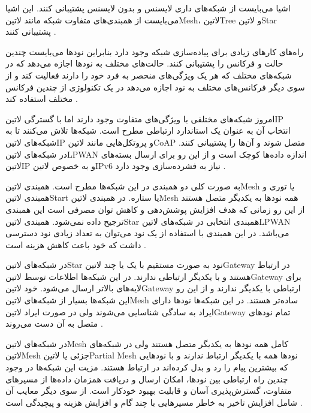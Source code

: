 
اشیا می‌بایست از شبکه‌های داری لایسنس و بدون لایسنس پشتیبانی کنند.
این اشیا می‌بایست از همبندی‌های متفاوت شبکه مانند ‌لاتین{Mesh}، ‌لاتین{Tree} و ‌لاتین{Star} پشتیبانی کنند
.

راه‌های کارهای زیادی برای پیاده‌سازی شبکه وجود دارد بنابراین نودها می‌بایست چندین حالت و فرکانس را پشتیبانی کنند.
حالت‌های مختلف به نودها اجازه می‌دهد که در شبکه‌های مختلف که هر یک ویژگی‌های منحصر به فرد خود را دارند
فعالیت کند و از سوی دیگر فرکانس‌های مختلف به نود اجازه می‌دهد در یک تکنولوژی از چندین فرکانس مختلف استفاده کند
.


امروز شبکه‌های مختلفی با ویژگی‌های متفاوت وجود دارند اما با گسترگی ‌لاتین{IP} انتخاب آن به عنوان
یک استاندارد ارتباطی مطرح است. شبکه‌ها تلاش می‌کنند تا به شبکه‌های ‌لاتین{IP} و پروتکل‌هایی مانند
‌لاتین{CoAP} متصل شوند و آن‌ها را پشتیبانی کنند.
در شبکه‌های ‌لاتین{LPWAN} اندازه داده‌ها کوچک است و از این رو برای ارسال بسته‌های ‌لاتین{IP} و
به خصوص ‌لاتین{IPv6} نیاز به فشرده‌سازی وجود دارد
.


به صورت کلی دو همبندی در این شبکه‌ها مطرح است. همبندی ‌لاتین{Mesh} یا توری
و همبندی ‌لاتین{Start} یا ستاره.
در همبندی ‌لاتین{Mesh} همه نودها به یکدیگر متصل هستند از این رو زمانی که هدف
افزایش پوشش‌دهی و کاهش توان مصرفی است این همبندی ترجیح داده نمی‌شود. همبندی
‌لاتین{Star} همبندی انتخابی در شبکه‌های ‌لاتین{LPWAN} می‌باشد.
در این همبندی با استفاده از یک نود می‌توان به تعداد زیادی نود دسترسی داشت که
خود باعث کاهش هزینه است
.

در شبکه‌های ‌لاتین{Star} نود به صورت مستقیم با یک یا چند ‌لاتین{Gateway} در ارتباط هستند
و با یکدیگر ارتباطی ندارند. در این شبکه‌ها اطلاعات توسط ‌لاتین{Gateway} برای لایه‌های بالاتر ارسال می‌شود.
خود ‌لاتین{Gateway} ارتباطی با یکدیگر ندارند و از این رو این شبکه‌ها بسیار از شبکه‌های ‌لاتین{Mesh} ساده‌تر هستند.
در این شبکه‌ها نودها دارای ایراد به سادگی شناسایی می‌شوند ولی در صورت ایراد ‌لاتین{Gateway} تمام نودهای
متصل به آن دست می‌روند
.

در شبکه‌های ‌لاتین{Mesh} کامل همه نودها به یکدیگر متصل هستند ولی در شبکه‌های ‌لاتین{Mesh} جزئی یا ‌لاتین{Partial Mesh} نودها
همه با یکدیگر ارتباط ندارند و با نودهایی که بیشترین پیام را رد و بدل کرده‌اند در ارتباط هستند.
مزیت این شبکه‌ها در وجود چندین راه ارتباطی بین نودها، امکان ارسال و دریافت همزمان داده‌ها از مسیرهای متفاوت،
گسترش‌پذیری آسان و قابلیت بهبود خودکار است. از سوی دیگر معایب آن شامل افزایش تاخیر به خاطر مسیرهایی با چند گام و
افزایش هزینه و پیچیدگی است
.

